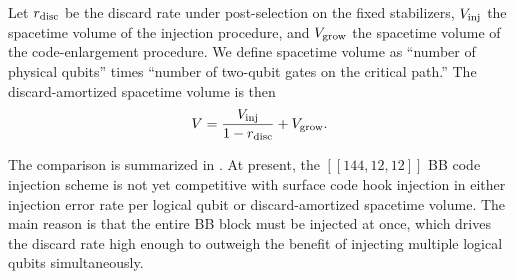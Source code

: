 Let $r_{\rm disc}$ be the discard rate under post-selection on the fixed stabilizers, $V_{\rm inj}$ the spacetime volume of the injection procedure, and $V_{\rm grow}$ the spacetime volume of the code-enlargement procedure. We define spacetime volume as ``number of physical qubits'' times ``number of two-qubit gates on the critical path.'' The discard-amortized spacetime volume is then
\begin{equation}
V = \frac{V_{\rm inj}}{1 - r_{\rm disc}} + V_{\rm grow}.
\label{eq:spacetime-volume}
\end{equation}

The comparison is summarized in . At present, the $[[144,12,12]]$ BB code injection scheme is not yet competitive with surface code hook injection in either injection error rate per logical qubit or discard-amortized spacetime volume. The main reason is that the entire BB block must be injected at once, which drives the discard rate high enough to outweigh the benefit of injecting multiple logical qubits simultaneously. 